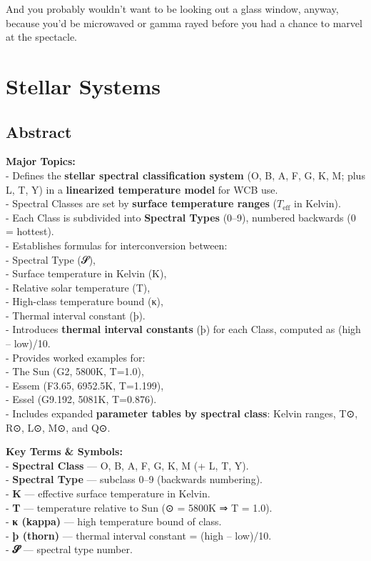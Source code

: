 \documentclass[
  letterpaper,
]{book}
\begin{document}
And you probably wouldn't want to be looking out a glass window, anyway,
because you'd be microwaved or gamma rayed before you had a chance to
marvel at the spectacle.

\part{Stellar Systems}

\chapter{Abstract}\label{abstract-6}

\textbf{Major Topics:}\\
- Defines the \textbf{stellar spectral classification system} (O, B, A,
F, G, K, M; plus L, T, Y) in a \textbf{linearized temperature model} for
WCB use.\\
- Spectral Classes are set by \textbf{surface temperature ranges}
(\(T_{\text{eff}}\) in Kelvin).\\
- Each Class is subdivided into \textbf{Spectral Types} (0--9), numbered
backwards (0 = hottest).\\
- Establishes formulas for interconversion between:\\
- Spectral Type (𝓢),\\
- Surface temperature in Kelvin (K),\\
- Relative solar temperature (T),\\
- High-class temperature bound (κ),\\
- Thermal interval constant (þ).\\
- Introduces \textbf{thermal interval constants} (þ) for each Class,
computed as (high -- low)/10.\\
- Provides worked examples for:\\
- The Sun (G2, 5800K, T=1.0),\\
- Essem (F3.65, 6952.5K, T=1.199),\\
- Essel (G9.192, 5081K, T=0.876).\\
- Includes expanded \textbf{parameter tables by spectral class}: Kelvin
ranges, T⊙, R⊙, L⊙, M⊙, and Q⊙.

\textbf{Key Terms \& Symbols:}\\
- \textbf{Spectral Class} --- O, B, A, F, G, K, M (+ L, T, Y).\\
- \textbf{Spectral Type} --- subclass 0--9 (backwards numbering).\\
- \textbf{K} --- effective surface temperature in Kelvin.\\
- \textbf{T} --- temperature relative to Sun (⊙ = 5800K ⇒ T = 1.0).\\
- \textbf{κ (kappa)} --- high temperature bound of class.\\
- \textbf{þ (thorn)} --- thermal interval constant = (high -- low)/10.\\
- \textbf{𝓢} --- spectral type number.
\end{document}
